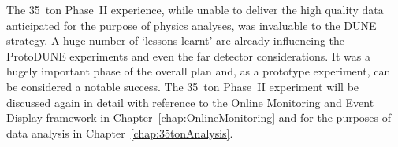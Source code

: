 The 35~ton Phase~II experience, while unable to deliver the high quality data anticipated for the purpose of physics analyses, was invaluable to the DUNE strategy.  A huge number of `lessons learnt' are already influencing the ProtoDUNE experiments and even the far detector considerations.  It was a hugely important phase of the overall plan and, as a prototype experiment, can be considered a notable success.  The 35~ton Phase~II experiment will be discussed again in detail with reference to the Online Monitoring and Event Display framework in Chapter~\ref{chap:OnlineMonitoring} and for the purposes of data analysis in Chapter~\ref{chap:35tonAnalysis}.


























